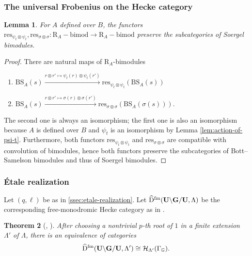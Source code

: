 \documentclass[a4paper, 10pt, oneside, reqno]{amsart}
\theoremstyle{plain}
\newtheorem{thm}{Theorem}[subsection]
\newtheorem{lem}[thm]{Lemma}
\theoremstyle{definition}
\theoremstyle{remark}
\newcommand{\Gbb}{\mathbb{G}}
\newcommand{\RR}{\mathrm{R}}
\newcommand{\BS}{\mathrm{BS}}
\newcommand{\fm}{\mathrm{fm}}
\newcommand{\bimod}{\mathrm{bimod}}
\newcommand{\restr}{\mathrm{res}}
\begin{document}
\subsubsection{The universal Frobenius on the Hecke category}

\begin{lem}
For $A$ defined over $B$, the functors $\restr_{\psi_t \otimes \psi_t}, \restr_{\sigma \otimes \sigma} : \RR_A-\bimod \to \RR_A-\bimod$ preserve the subcategories of Soergel bimodules. 
\end{lem}

\begin{proof}
There are natural maps of $\RR_A$-bimodules
\begin{enumerate}
\item $\BS_A(s) \xrightarrow{r \otimes r' \mapsto \psi_t(r) \otimes \psi_t(r')} \restr_{\psi_t \otimes \psi_t}(\BS_A(s))$
\item $\BS_A(s) \xrightarrow{r \otimes r' \mapsto \sigma(r) \otimes \sigma(r')} \restr_{\sigma \otimes \sigma}(\BS_A(\sigma(s))).$
\end{enumerate}
The second one is always an isomorphism; the first one is also an isomorphism because $A$ is defined over $B$ and $\psi_t$ is an isomorphism by Lemma \ref{lem:action-of-psi-t}. 
Furthermore, both functors $\restr_{\psi_t \otimes \psi_t}$ and $\restr_{\sigma \otimes \sigma}$ are compatible with convolution of bimodules, hence both functors preserve the subcategories of Bott--Samelson bimodules and thus of Soergel bimodules. 
\end{proof}



\subsubsection{\'{E}tale realization}

Let $(q, \ell)$ be as in \ref{ssec:etale-realization}. Let $\widehat{\DD}^{\fm}(\Ubf \backslash \Gbf/\Ubf, \Lambda)$ be the corresponding free-monodromic Hecke category as in \cite{BezYun, BezrukavnikovRiche}. 

\begin{thm}[, ]\label{thm:equiv-specialization-with-hecke-category}
After choosing a nontrivial $p$-th root of $1$ in a finite extension $\Lambda'$ of $\Lambda$, there is an equivalence of categories
\begin{equation}\label{eq:specialization-hecke-category-to-geometry}
\widehat{\DD}^{\fm}(\Ubf \backslash \Gbf/\Ubf, \Lambda') \cong \Hcal_{\Lambda'}(\Gamma_{\Gbb}). 
\end{equation}
\end{thm} 
\end{document}
